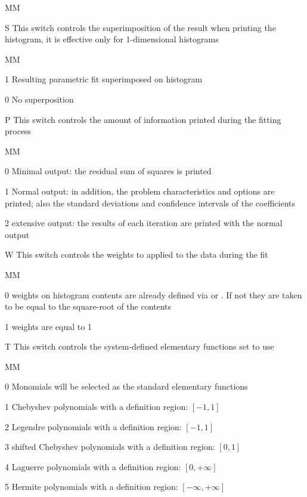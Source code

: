 \begin{DLtt}{MM}
\item[S] This switch controls the superimposition of the
result when
printing the histogram, it is effective only
for 1-dimensional histograms
\begin{DLtt}{MM}
\item[1] Resulting parametric fit superimposed on histogram
\item[0] No superposition
\end{DLtt}
\item[P] This switch controls the amount of information
printed during the
fitting process
\begin{DLtt}{MM}
\item[0] Minimal output: the residual sum of squares is
printed
\item[1] Normal output: in addition, the problem characteristics
and
options are printed; also the standard deviations and confidence intervals
of the coefficients
\item[2] extensive output: the results of each iteration
are printed with the
normal output
\end{DLtt}
\item[W] This switch controls the weights to applied to
the data during the fit
\begin{DLtt}{MM}
\item[0] weights on histogram contents are already defined via
 or . If not they are taken to be equal to the
square-root of the contents
\item[1] weights are equal to 1
\end{DLtt}
\item[T] This switch controls the system-defined elementary
functions set to use
\begin{DLtt}{MM}
\item[0] Monomials will be selected as the standard elementary
functions
\item[1] Chebyshev polynomials with a definition region: $[-1,1]$
\item[2] Legendre polynomials with a definition region: $[-1,1]$
\item[3] shifted Chebyshev polynomials with a definition region: $[0,1]$
\item[4] Laguerre polynomials with a definition region: $[0,+\infty]$
\item[5] Hermite polynomials with a definition region:  $[-\infty,+\infty]$
\end{DLtt}
\finalnewpage

\end{DLtt}
